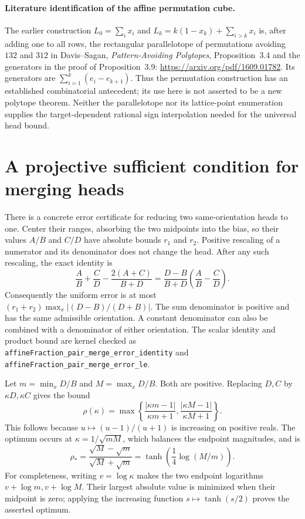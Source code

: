 \documentclass[11pt]{article}
\begin{document}
\paragraph{Literature identification of the affine permutation cube.}
The earlier construction $L_0=\sum_i x_i$ and
$L_k=k(1-x_k)+\sum_{i>k}x_i$ is, after adding one to all rows,
the rectangular parallelotope of permutations avoiding $132$ and $312$
in Davis--Sagan, \emph{Pattern-Avoiding Polytopes}, Proposition~3.4
and the generators in the proof of Proposition~3.9:
\url{https://arxiv.org/pdf/1609.01782}.
Its generators are $\sum_{i=1}^k(e_i-e_{k+1})$.
Thus the permutation construction has an established combinatorial
antecedent; its use here is not asserted to be a new polytope theorem.
Neither the parallelotope nor its lattice-point enumeration supplies
the target-dependent rational sign interpolation needed for the
universal head bound.

\section{A projective sufficient condition for merging heads}

There is a concrete error certificate for reducing two same-orientation
heads to one. Center their ranges, absorbing the two midpoints into
the bias, so their values $A/B$ and $C/D$ have absolute bounds $r_1$
and $r_2$. Positive rescaling of a numerator and its denominator does
not change the head. After any such rescaling, the exact identity is
\[
 \frac AB+\frac CD-\frac{2(A+C)}{B+D}
 =\frac{D-B}{B+D}\left(\frac AB-\frac CD\right).
\]
Consequently the uniform error is at most
$(r_1+r_2)\max_x |(D-B)/(D+B)|$. The sum denominator is positive
and has the same admissible orientation. A constant denominator can
also be combined with a denominator of either orientation.
The scalar identity and product bound are kernel checked as
\texttt{affineFraction\_pair\_merge\_error\_identity} and
\texttt{affineFraction\_pair\_merge\_error\_le}.

Let $m=\min_xD/B$ and $M=\max_xD/B$. Both are positive. Replacing
$D,C$ by $\kappa D,\kappa C$ gives the bound
\[
 \rho(\kappa)=\max\left\{
 \frac{|\kappa m-1|}{\kappa m+1},
 \frac{|\kappa M-1|}{\kappa M+1}\right\}.
\]
This follows because $u\mapsto(u-1)/(u+1)$ is increasing on
positive reals. The optimum occurs at
$\kappa=1/\sqrt{mM}$, which balances the endpoint magnitudes, and is
\[
 \rho_* = \frac{\sqrt M-\sqrt m}{\sqrt M+\sqrt m}
 =\tanh\left(\frac14\log(M/m)\right).
\]
For completeness, writing $v=\log\kappa$ makes the two endpoint
logarithms $v+\log m,v+\log M$. Their largest absolute value is
minimized when their midpoint is zero; applying the increasing function
$s\mapsto\tanh(s/2)$ proves the asserted optimum.
\end{document}
